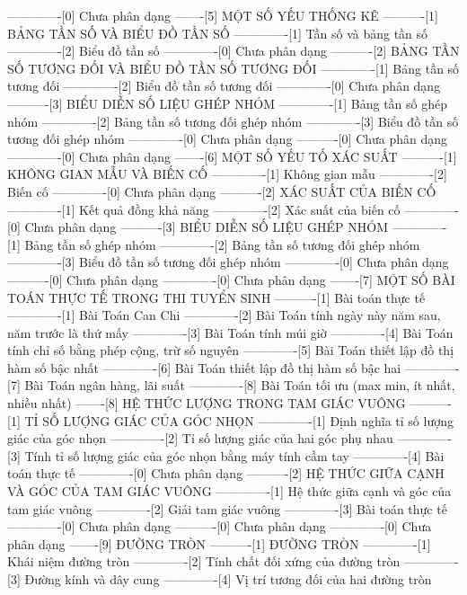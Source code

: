 -------------[0] Chưa phân dạng
-------[5] MỘT SỐ YẾU THỐNG KÊ
----------[1] BẢNG TẦN SỐ VÀ BIỂU ĐỒ TẦN SỐ
-------------[1] Tần số và bảng tần số
-------------[2] Biểu đồ tần số
-------------[0] Chưa phân dạng
----------[2] BẢNG TẦN SỐ TƯƠNG ĐỐI VÀ BIỂU ĐỒ TẦN SỐ TƯƠNG ĐỐI
-------------[1] Bảng tần số tương đối
-------------[2] Biểu đồ tần số tương đối
-------------[0] Chưa phân dạng
----------[3] BIỂU DIỄN SỐ LIỆU GHÉP NHÓM
-------------[1] Bảng tần số ghép nhóm
-------------[2] Bảng tần số tương đối ghép nhóm
-------------[3] Biểu đồ tần số tương đối ghép nhóm
-------------[0] Chưa phân dạng
----------[0] Chưa phân dạng
-------------[0] Chưa phân dạng
-------[6] MỘT SỐ YẾU TỐ XÁC SUẤT
----------[1] KHÔNG GIAN MẪU VÀ BIẾN CỐ
-------------[1] Không gian mẫu
-------------[2] Biến cố
-------------[0] Chưa phân dạng
----------[2] XÁC SUẤT CỦA BIẾN CỐ
-------------[1] Kết quả đồng khả năng
-------------[2] Xác suất của biến cố
-------------[0] Chưa phân dạng
----------[3] BIỂU DIỄN SỐ LIỆU GHÉP NHÓM
-------------[1] Bảng tần số ghép nhóm
-------------[2] Bảng tần số tương đối ghép nhóm
-------------[3] Biểu đồ tần số tương đối ghép nhóm
-------------[0] Chưa phân dạng
----------[0] Chưa phân dạng
-------------[0] Chưa phân dạng
-------[7] MỘT SỐ BÀI TOÁN THỰC TẾ TRONG THI TUYỂN SINH
----------[1] Bài toán thực tế
-------------[1] Bài Toán Can Chi
-------------[2] Bài Toán tính ngày này năm sau, năm trước là thứ mấy
-------------[3] Bài Toán tính múi giờ
-------------[4] Bài Toán tính chỉ số bằng phép cộng, trừ số nguyên
-------------[5] Bài Toán thiết lập đồ thị hàm số bậc nhất
-------------[6] Bài Toán thiết lập đồ thị hàm số bậc hai
-------------[7] Bài Toán ngân hàng, lãi suất
-------------[8] Bài Toán tối ưu (max min, ít nhất, nhiều nhất)
-------[8] HỆ THỨC LƯỢNG TRONG TAM GIÁC VUÔNG
----------[1] TỈ SỐ LƯỢNG GIÁC CỦA GÓC NHỌN
-------------[1] Định nghĩa tỉ số lượng giác của góc nhọn
-------------[2] Tỉ số lượng giác của hai góc phụ nhau
-------------[3] Tính tỉ số lượng giác của góc nhọn bằng máy tính cầm tay
-------------[4] Bài toán thực tế
-------------[0] Chưa phân dạng
----------[2] HỆ THỨC GIỮA CẠNH VÀ GÓC CỦA TAM GIÁC VUÔNG
-------------[1] Hệ thức giữa cạnh và góc của tam giác vuông
-------------[2] Giải tam giác vuông
-------------[3] Bài toán thực tế
-------------[0] Chưa phân dạng
----------[0] Chưa phân dạng
-------------[0] Chưa phân dạng
-------[9] ĐƯỜNG TRÒN
----------[1] ĐƯỜNG TRÒN
-------------[1] Khái niệm đường tròn
-------------[2] Tính chất đối xứng của đường tròn
-------------[3] Đường kính và dây cung
-------------[4] Vị trí tương đối của hai đường tròn
